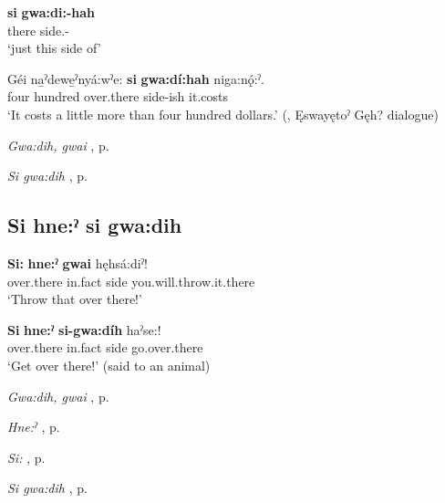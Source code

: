 \ea
\label{ex:spart53}
\gll \textbf{si} \textbf{gwa:di:-hah} {}\\
there side.\textsc{\stative-\diminutive}\\
\glt ‘just this side of’
\z

\ea
\label{ex:spart54}
\gll Géi na̱ˀdewe̱ˀnyá:wˀe: \textbf{si} \textbf{gwa:dí:hah} niga:nǫ́:ˀ.\\
four hundred over.there side-ish it.costs\\
\glt ‘It costs a little more than four hundred dollars.’ (\cite[420]{mithun_watewayestanih_1984}, Ęswayętoˀ Gęh? dialogue)
\z

\begin{CayugaRelated}
\item \textit{Gwa:dih, gwai} , p. \pageref{p:[gwa:dih]}\\
\item \textit{Si gwa:dih} , p. \pageref{p:[si gwa:dih] ‘over there’}
\end{CayugaRelated}

\subsection*{\textbf{Si hne:ˀ si gwa:dih} } \label{p:[si hne:ˀ si gwa:dih]}

\ea
\label{ex:spart55}
\gll \textbf{Si:} \textbf{hne:ˀ} \textbf{gwai} hęhsá:diˀ!\\
over.there in.fact side you.will.throw.it.there\\
\glt ‘Throw that over there!’
\z

\ea
\label{ex:spart56}
\gll \textbf{Si} \textbf{hne:ˀ} \textbf{si-gwa:díh} haˀse:!\\
over.there in.fact side go.over.there\\
\glt ‘Get over there!’ (said to an animal)
\z

\begin{CayugaRelated}
\item \textit{Gwa:dih, gwai} , p. \pageref{p:[gwa:dih]}\\
\item \textit{Hne:ˀ} , p. \pageref{p:[hne:ˀ] ‘in fact’}\\
\item \textit{Si:} , p. \pageref{p:[si:]}\\
\item \textit{Si gwa:dih} , p. \pageref{p:[si gwa:dih] ‘move it!’}
\end{CayugaRelated}

